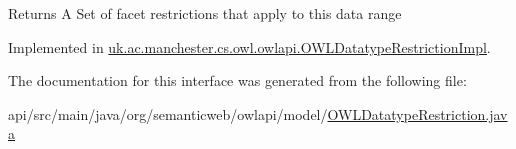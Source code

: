 \begin{DoxyReturn}{Returns}
A {\ttfamily Set} of facet restrictions that apply to this data range 
\end{DoxyReturn}


Implemented in \hyperlink{classuk_1_1ac_1_1manchester_1_1cs_1_1owl_1_1owlapi_1_1_o_w_l_datatype_restriction_impl_a13ea94dcc810f1069c04f2cac0768103}{uk.\-ac.\-manchester.\-cs.\-owl.\-owlapi.\-O\-W\-L\-Datatype\-Restriction\-Impl}.



The documentation for this interface was generated from the following file\-:\begin{DoxyCompactItemize}
\item 
api/src/main/java/org/semanticweb/owlapi/model/\hyperlink{_o_w_l_datatype_restriction_8java}{O\-W\-L\-Datatype\-Restriction.\-java}\end{DoxyCompactItemize}
